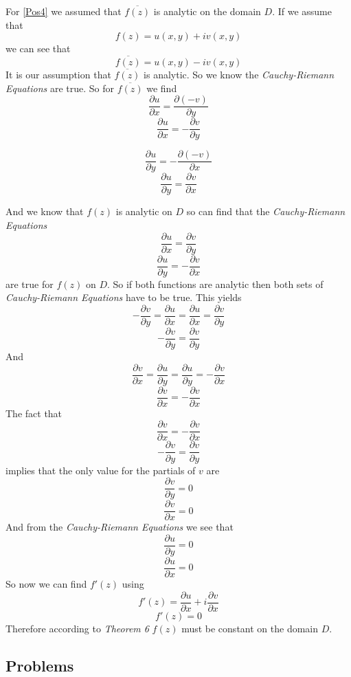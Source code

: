 \documentclass[11pt]{article}
\begin{document}
\begin{enumerate}
For \ref{Pos4} we assumed that $\overline{f(z)}$ is analytic on the domain $D$. 
If we assume that 
$$f(z) = u(x,y) +iv(x,y)$$
we can see that 
$$\overline{f(z)} = u(x,y) -iv(x,y)$$
It is our assumption that $\overline{f(z)}$ is analytic. So we know the \emph{Cauchy-Riemann Equations} are true. So for $\overline{f(z)}$ we find
$$\frac{\partial u}{\partial x}=\frac{\partial (-v)}{\partial y}$$
$$\frac{\partial u}{\partial x}=-\frac{\partial v}{\partial y}$$

$$\frac{\partial u}{\partial y}=-\frac{\partial (-v)}{\partial x}$$
$$\frac{\partial u}{\partial y}=\frac{\partial v}{\partial x}$$

And we know that $f(z)$ is analytic on $D$ so can find that the \emph{Cauchy-Riemann Equations}
$$\frac{\partial u}{\partial x}=\frac{\partial v}{\partial y}$$
$$\frac{\partial u}{\partial y}=-\frac{\partial v}{\partial x}$$
are true for $f(z)$ on $D$. So if both functions are analytic then both sets of \emph{Cauchy-Riemann Equations} have to be true. This yields 
$$-\frac{\partial v}{\partial y}=\frac{\partial u}{\partial x}=\frac{\partial u}{\partial x}=\frac{\partial v}{\partial y}$$
$$-\frac{\partial v}{\partial y}=\frac{\partial v}{\partial y}$$
And
$$\frac{\partial v}{\partial x}=\frac{\partial u}{\partial y}=\frac{\partial u}{\partial y}=-\frac{\partial v}{\partial x}$$
$$\frac{\partial v}{\partial x}=-\frac{\partial v}{\partial x}$$
The fact that 
$$\frac{\partial v}{\partial x}=-\frac{\partial v}{\partial x}$$
$$-\frac{\partial v}{\partial y}=\frac{\partial v}{\partial y}$$
implies that the only value for the partials of $v$ are
$$\frac{\partial v}{\partial y}=0$$
$$\frac{\partial v}{\partial x}=0$$
And from the \emph{Cauchy-Riemann Equations} we see that 
$$\frac{\partial u}{\partial y}=0$$
$$\frac{\partial u}{\partial x}=0$$
So now we can find $f'(z)$ using
$$f'(z) = \frac{\partial u}{\partial x} + i\frac{\partial v}{\partial x}$$
$$f'(z) = 0$$
Therefore according to \emph{Theorem 6} $f(z)$ must be constant on the domain $D$.

\end{enumerate}

\subsection*{Problems}
\end{document}
